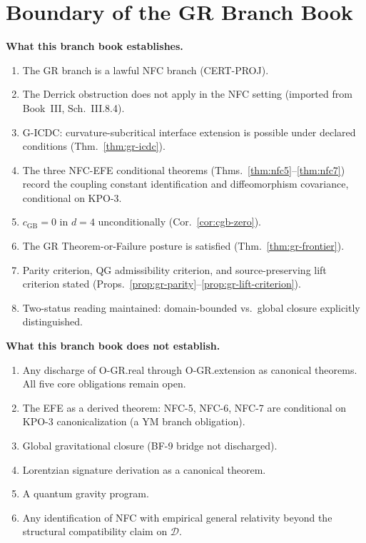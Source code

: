 \documentclass[12pt,oneside]{amsbook}
\theoremstyle{plain}
\theoremstyle{definition}
\theoremstyle{remark}
\begin{document}
\section{Boundary of the GR Branch Book}

\textbf{What this branch book establishes.}
\begin{enumerate}
 \item The GR branch is a lawful NFC branch (CERT-PROJ).
 \item The Derrick obstruction does not apply in the NFC setting
 (imported from Book~III, Sch.~III.8.4).
 \item G-ICDC: curvature-subcritical interface extension is
 possible under declared conditions (Thm.~\ref{thm:gr-icdc}).
 \item The three NFC-EFE conditional theorems
 (Thms.~\ref{thm:nfc5}--\ref{thm:nfc7}) record the
 coupling constant identification and diffeomorphism
 covariance, conditional on KPO-3.
 \item $c_{\mathrm{GB}} = 0$ in $d=4$ unconditionally
 (Cor.~\ref{cor:cgb-zero}).
 \item The GR Theorem-or-Failure posture is satisfied
 (Thm.~\ref{thm:gr-frontier}).
 \item Parity criterion, QG admissibility criterion, and
 source-preserving lift criterion stated
 (Props.~\ref{prop:gr-parity}--\ref{prop:gr-lift-criterion}).
 \item Two-status reading maintained: domain-bounded vs.\ global
 closure explicitly distinguished.
\end{enumerate}

\textbf{What this branch book does not establish.}
\begin{enumerate}
 \item Any discharge of O-GR.real through O-GR.extension as
 canonical theorems. All five core obligations remain open.
 \item The EFE as a derived theorem: NFC-5, NFC-6, NFC-7 are
 conditional on KPO-3 canonicalization (a YM branch
 obligation).
 \item Global gravitational closure (BF-9 bridge not discharged).
 \item Lorentzian signature derivation as a canonical theorem.
 \item A quantum gravity program.
 \item Any identification of NFC with empirical general relativity
 beyond the structural compatibility claim on $\mathcal{D}$.
\end{enumerate}
\end{document}

